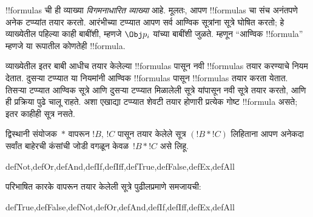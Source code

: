 \documentclass[../../../include/open-logic-section]{subfiles}
\begin{document}
\begin{explain}
!!{formula}s ची ही व्याख्या \emph{विगमनाधारित व्याख्या} आहे. मूलतः,
आपण !!{formula}s चा संच अनंतपणे अनेक टप्प्यांत तयार करतो. आरंभीच्या
टप्प्यात आपण सर्व आण्विक सूत्रांना सूत्रे घोषित करतो; हे व्याख्येतील
पहिल्या काही बाबींशी, म्हणजे
%
%
$\Obj p_i$ यांच्या बाबींशी जुळते. म्हणून ``आण्विक !!{formula}''
म्हणजे या रूपातील कोणतेही !!{formula}.

व्याख्येतील इतर बाबी आधीच तयार केलेल्या !!{formula}s पासून नवी
!!{formula}s तयार करण्याचे नियम देतात. दुसऱ्या टप्प्यात या नियमांनी
आण्विक !!{formula}s पासून !!{formula}s तयार करता येतात. तिसऱ्या
टप्प्यात आण्विक सूत्रे आणि दुसऱ्या टप्प्यात मिळालेली सूत्रे यांपासून
नवी सूत्रे तयार करतो, आणि ही प्रक्रिया पुढे चालू राहते. अशा एखाद्या
टप्प्यात शेवटी तयार होणारी प्रत्येक गोष्ट !!{formula} असते; इतर
काहीही सूत्र नसते.
\end{explain}

द्विस्थानी संयोजक~$\ast$ वापरून $!B$, $!C$ पासून तयार केलेले
सूत्र $(!B \ast !C)$ लिहिताना आपण अनेकदा सर्वांत बाहेरची कंसांची
जोडी वगळून केवळ~$!B \ast !C$ असे लिहू.

\begin{tagblock}{defNot,defOr,defAnd,defIf,defIff,defTrue,defFalse,defEx,defAll}
\begin{defn}
परिभाषित कारके वापरून तयार केलेली सूत्रे पुढीलप्रमाणे समजायची:

\begin{tagenumerate}{defTrue,defFalse,defNot,defOr,defAnd,defIf,defIff,defEx,defAll}







\end{tagenumerate}
\end{defn}
\end{tagblock}
\end{document}

